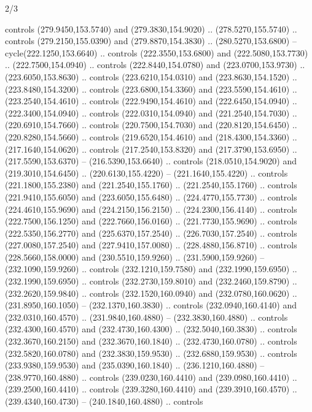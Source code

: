 \begin{flagdescription}{2/3}
\begin{scope}[xshift=0.5\flaglength,yshift=0.5\flagwidth,scale=\flagwidth/259.2]
\begin{scope}[y=0.8pt, x=0.8pt, yscale=-1,shift={(-243,-162)}]
      controls (279.9450,153.5740) and (279.3830,154.9020) .. (278.5270,155.5740) ..
      controls (279.2150,155.0390) and (279.8870,154.3830) .. (280.5270,153.6800) --
      cycle(222.1250,153.6640) .. controls (222.3550,153.6800) and
      (222.5080,153.7730) .. (222.7500,154.0940) .. controls (222.8440,154.0780) and
      (223.0700,153.9730) .. (223.6050,153.8630) .. controls (223.6210,154.0310) and
      (223.8630,154.1520) .. (223.8480,154.3200) .. controls (223.6800,154.3360) and
      (223.5590,154.4610) .. (223.2540,154.4610) .. controls (222.9490,154.4610) and
      (222.6450,154.0940) .. (222.3400,154.0940) .. controls (222.0310,154.0940) and
      (221.2540,154.7030) .. (220.6910,154.7660) .. controls (220.7500,154.7030) and
      (220.8120,154.6450) .. (220.8280,154.5660) .. controls (219.6520,154.4610) and
      (218.4300,154.3360) .. (217.1640,154.0620) .. controls (217.2540,153.8320) and
      (217.3790,153.6950) .. (217.5590,153.6370) -- (216.5390,153.6640) .. controls
      (218.0510,154.9020) and (219.3010,154.6450) .. (220.6130,155.4220) --
      (221.1640,155.4220) .. controls (221.1800,155.2380) and (221.2540,155.1760) ..
      (221.2540,155.1760) .. controls (221.9410,155.6050) and (223.6050,155.6480) ..
      (224.4770,155.7730) .. controls (224.4610,155.9690) and (224.2150,156.2150) ..
      (224.2300,156.4140) .. controls (222.7500,156.1250) and (222.7660,156.0160) ..
      (221.7730,155.9690) .. controls (222.5350,156.2770) and (225.6370,157.2540) ..
      (226.7030,157.2540) .. controls (227.0080,157.2540) and (227.9410,157.0080) ..
      (228.4880,156.8710) .. controls (228.5660,158.0000) and (230.5510,159.9260) ..
      (231.5900,159.9260) -- (232.1090,159.9260) .. controls (232.1210,159.7580) and
      (232.1990,159.6950) .. (232.1990,159.6950) .. controls (232.2730,159.8010) and
      (232.2460,159.8790) .. (232.2620,159.9840) .. controls (232.1520,160.0940) and
      (232.0780,160.0620) .. (231.8950,160.1050) -- (232.1370,160.3830) .. controls
      (232.0940,160.4140) and (232.0310,160.4570) .. (231.9840,160.4880) --
      (232.3830,160.4880) .. controls (232.4300,160.4570) and (232.4730,160.4300) ..
      (232.5040,160.3830) .. controls (232.3670,160.2150) and (232.3670,160.1840) ..
      (232.4730,160.0780) .. controls (232.5820,160.0780) and (232.3830,159.9530) ..
      (232.6880,159.9530) .. controls (233.9380,159.9530) and (235.0390,160.1840) ..
      (236.1210,160.4880) -- (238.9770,160.4880) .. controls (239.0230,160.4410) and
      (239.0980,160.4410) .. (239.2500,160.4410) .. controls (239.3280,160.4410) and
      (239.3910,160.4570) .. (239.4340,160.4730) -- (240.1840,160.4880) .. controls

\end{scope}
\end{scope}
\end{flagdescription}
